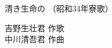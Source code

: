 \documentclass[10pt,b5j]{tarticle} %
\begin{document}
\begin{minipage}[c]{0.7\hsize} %
    \begin{center}
        {\LARGE
            清き生命の %
        }
        {\small 
            （昭和34年寮歌） %
        }
    \end{center}
\end{minipage}
\begin{minipage}[c]{0.3\hsize} %
    \begin{flushright} %
        吉野生壮君 作歌\\中川清吾君 作曲 %
    \end{flushright}
\end{minipage}
\end{document}
